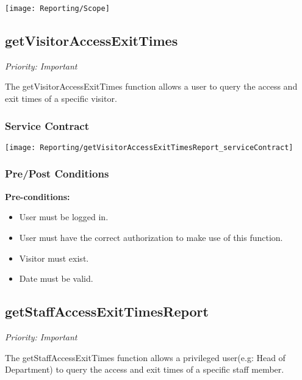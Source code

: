 \texttt{[image: Reporting/Scope]}
\subsection{getVisitorAccessExitTimes}
\textit{Priority: Important}

	The getVisitorAccessExitTimes function allows a user to query the access and exit times of a specific visitor.

		
\subsubsection{Service Contract}
\texttt{[image: Reporting/getVisitorAccessExitTimesReport\_serviceContract]}
\subsubsection{Pre/Post Conditions}
	\textbf{Pre-conditions:}
	\begin{itemize}
		\item User must be logged in.
		\item User must have the correct authorization to make use of this function.
		\item Visitor must exist.
		\item Date must be valid.
	\end{itemize}

\subsection{getStaffAccessExitTimesReport}
\textit{Priority: Important}

	The getStaffAccessExitTimes function allows a privileged user(e.g: Head of Department) to query the access and exit times of a specific staff member.


